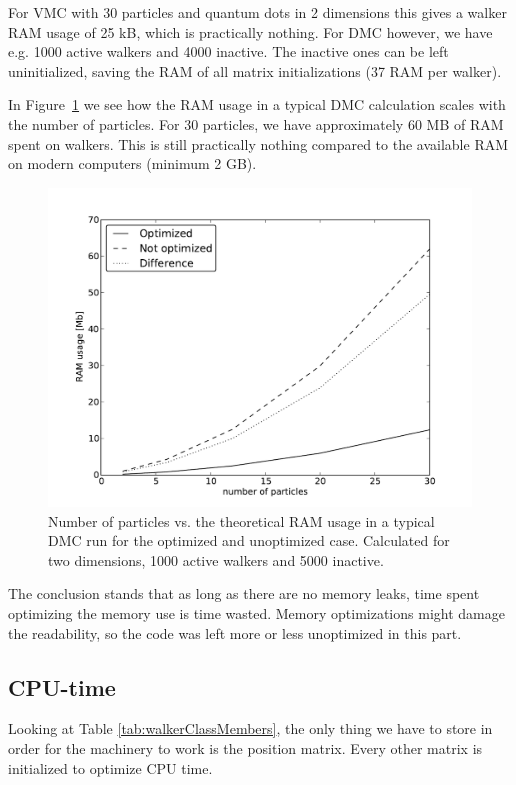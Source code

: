 For VMC with 30 particles and quantum dots in 2 dimensions this gives a walker RAM usage of 25 kB, which is practically nothing. For DMC however, we have e.g. 1000 active walkers and 4000 inactive. The inactive ones can be left uninitialized, saving the RAM of all matrix initializations (37 RAM per walker). 

In Figure~\ref{FIG:RAMusageDMC} we see how the RAM usage in a typical DMC calculation scales with the number of particles. For 30 particles, we have approximately 60 MB of RAM spent on walkers. This is still practically nothing compared to the available RAM on modern computers (minimum 2 GB).

\begin{figure}
\label{FIG:RAMusageDMC}
 \begin{center}
  \includegraphics[scale=0.75]{../Graphics/RAMusagePrWalker.pdf}
  \caption{Number of particles vs. the theoretical RAM usage in a typical DMC run for the optimized and unoptimized case. Calculated for two dimensions, 1000 active walkers and 5000 inactive.}
 \end{center}
\end{figure}

The conclusion stands that as long as there are no memory leaks, time spent optimizing the memory use is time wasted. Memory optimizations might damage the readability, so the code was left more or less unoptimized in this part.

\subsection{CPU-time}
Looking at Table \ref{tab:walkerClassMembers}, the only thing we have to store in order for the machinery to work is the position matrix. Every other matrix is initialized to optimize CPU time.

